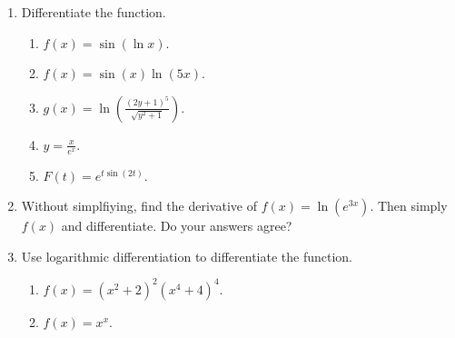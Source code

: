 
\begin{enumerate}

	\item	Differentiate the function.
		\begin{enumerate}
			\item	$f(x) = \sin(\ln x)$.
			\item 	$f(x) = \sin(x) \ln(5x)$.
			\item	$g(x) = \ln\left( \frac{ (2y+1)^5 }{ \sqrt{ y^2+1} } \right)$.
			\item	$y = \frac{x}{e^x}$.
			\item	$F(t) = e^{t \sin(2t) }$.
		\end{enumerate}

	\item 	Without simplfiying, find the derivative of $f(x) = \ln( e^{3x} )$. 
			Then simply $f(x)$ and differentiate. Do your answers agree?

	\item 	Use logarithmic differentiation to differentiate the function.
		\begin{enumerate}
			\item	$f(x) = (x^2+2)^2(x^4+4)^4$.	
			\item	$f(x) = x^x$.
		\end{enumerate}


\end{enumerate}   


